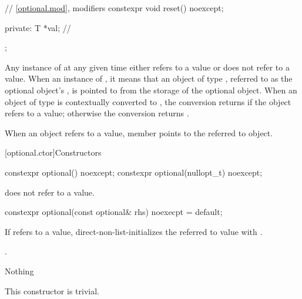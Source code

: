 \documentclass[a4paper,10pt,oneside,openany,final,article]{memoir}
\begin{document}
\begin{wording}
\begin{addedblock}
\begin{codeblock}
{{        // \ref{optional.mod}, modifiers
        constexpr void reset() noexcept;

      private:
        T *val;         // \expos
      };
    }
  \end{codeblock}

  \pnum
  Any instance of  at any given time either refers to a value or does not refer to a value.
  When an instance of  ,
  it means that an object of type , referred to as the optional object's ,
  is pointed to from the storage of the optional object.
  When an object of type  is contextually converted to ,
  the conversion returns  if the object refers to a value;
  otherwise the conversion returns .

  \pnum
  When an  object refers to a value,
  member  points to the referred to object.
  \end{addedblock}

  [optional.ctor]{Constructors}

  \begin{itemdecl}
    constexpr optional() noexcept;
    constexpr optional(nullopt_t) noexcept;
  \end{itemdecl}

  \begin{itemdescr}
    \pnum
    \ensures
     does not refer to a value.
  \end{itemdescr}

  \begin{itemdecl}
    constexpr optional(const optional& rhs) noexecpt = default;
  \end{itemdecl}

  \begin{itemdescr}
    \pnum
    \effects
    If  refers to a value, direct-non-list-initializes the referred to value
    with .

    \pnum
    \ensures
    .

    \pnum
    \throws
    Nothing

    \pnum
    \remarks
    This constructor is trivial.

  \end{itemdescr}


\end{wording}
\end{document}
